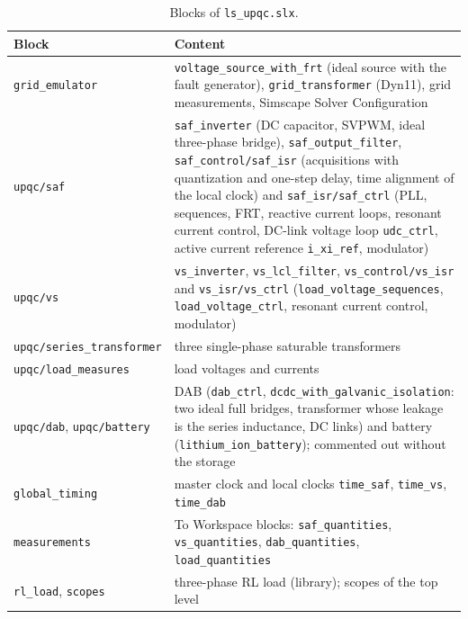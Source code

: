 \documentclass[11pt,a4paper]{scrartcl}
\newcommand{\code}[1]{\texttt{#1}}
\begin{document}
\begin{onehalfspace}
\begin{table}[H]
	\centering
	\captionsetup{width=0.9\textwidth, font=small}
	\caption{Blocks of \code{ls\_upqc.slx}.}
	\label{tab:blocks}
	\footnotesize
	\begin{tabularx}{0.97\textwidth}{@{} >{\raggedright\arraybackslash}p{} X @{}}
		\toprule
		\textbf{Block} & \textbf{Content} \\
		\midrule
		\code{grid\_emulator} & \code{voltage\_source\_with\_frt} (ideal source with the fault generator), \code{grid\_transformer} (Dyn11), grid measurements, Simscape Solver Configuration \\
		\code{upqc/saf} & \code{saf\_inverter} (DC capacitor, SVPWM, ideal three-phase bridge), \code{saf\_output\_filter}, \code{saf\_control/saf\_isr} (acquisitions with quantization and one-step delay, time alignment of the local clock) and \code{saf\_isr/saf\_ctrl} (PLL, sequences, FRT, reactive current loops, resonant current control, DC-link voltage loop \code{udc\_ctrl}, active current reference \code{i\_xi\_ref}, modulator) \\
		\code{upqc/vs} & \code{vs\_inverter}, \code{vs\_lcl\_filter}, \code{vs\_control/vs\_isr} and \code{vs\_isr/vs\_ctrl} (\code{load\_voltage\_sequences}, \code{load\_voltage\_ctrl}, resonant current control, modulator) \\
		\code{upqc/series\_transformer} & three single-phase saturable transformers \\
		\code{upqc/load\_measures} & load voltages and currents \\
		\code{upqc/dab}, \code{upqc/battery} & DAB (\code{dab\_ctrl}, \code{dcdc\_with\_galvanic\_isolation}: two ideal full bridges, transformer whose leakage is the series inductance, DC links) and battery (\code{lithium\_ion\_battery}); commented out without the storage \\
		\code{global\_timing} & master clock and local clocks \code{time\_saf}, \code{time\_vs}, \code{time\_dab} \\
		\code{measurements} & To Workspace blocks: \code{saf\_quantities}, \code{vs\_quantities}, \code{dab\_quantities}, \code{load\_quantities} \\
		\code{rl\_load}, \code{scopes} & three-phase RL load (library); scopes of the top level \\
		\bottomrule
	\end{tabularx}
\end{table}


\end{onehalfspace}
\end{document}
